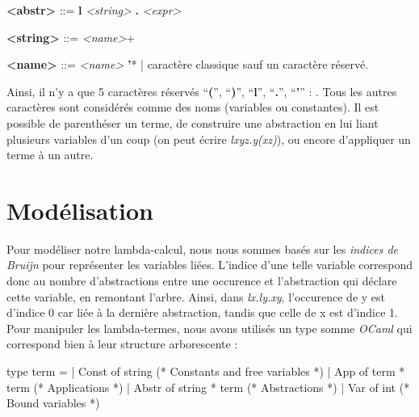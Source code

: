 \documentclass[11pt,a4paper]{report}
\begin{document}
\textbf{<abstr>}  ::= \textbf{l} \textit{<string>} \textbf{.} \textit{<expr>}

\textbf{<string>}  ::= \textit{<name>}+

\textbf{<name>}  ::=  \textit{<name>} \textbf{'}*
           | caractère classique sauf un caractère réservé.

\medskip

Ainsi, il n'y a que 5 caractères réservés ``\textbf{(}'', ``\textbf{)}'', ``\textbf{l}'', ``\textbf{.}'', ``\textbf{'}'' : . Tous les autres caractères sont considérés comme des noms (variables ou constantes). Il est possible de parenthéser un terme, de construire une abstraction en lui liant plusieurs variables d'un coup (on peut écrire \textit{lxyz.y(xz)}), ou encore d'appliquer un terme à un autre.

\section{Modélisation}
\bigskip
Pour modéliser notre lambda-calcul, nous nous sommes basés sur les \emph{indices de Bruijn} pour représenter les variables liées. L'indice d'une telle variable correspond donc au nombre d'abstractions entre une occurence et l'abstraction qui déclare cette variable, en remontant l'arbre. Ainsi, dans \textit{lx.ly.xy}, l'occurence de y est d'indice 0 car liée à la dernière abstraction, tandis que celle de x est d'indice 1. Pour manipuler les lambda-termes, nous avons utilisés un type somme \textit{OCaml} qui correspond bien à leur structure arborescente :

\begin{OCaml}

type term =
| Const of string         (* Constants and free variables *)
| App of term * term      (* Applications *)  
| Abstr of string * term  (* Abstractions *)
| Var of int              (* Bound variables *)

\end{OCaml}
\end{document}
